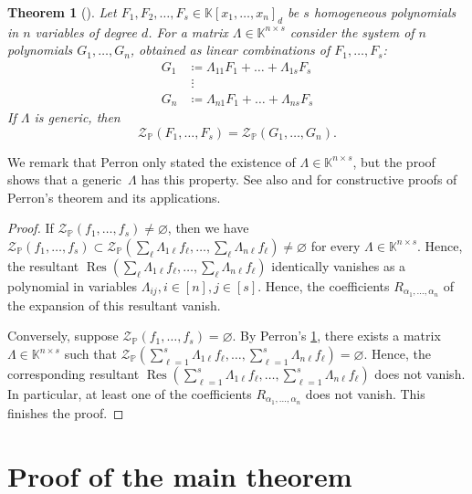 \documentclass[11pt,a4paper]{article}
\newtheorem{theorem}{Theorem}[section]
\numberwithin{equation}{section}
\newcommand{\PP}{\mathbb{P}}
\newcommand{\KK}{\mathbb{K}}
\newcommand{\cZ}{\mathcal{Z}}
\DeclareMathOperator{\Res}{Res}
\begin{document}
\begin{theorem}[{\cite[Satz~3]{Perron-41}}]
\label{thm:perron}
    Let $F_1,F_2,\dots,F_s\in\KK[x_1,\dots,x_n]_d$ be $s$ homogeneous polynomials in $n$ variables of degree $d$. 
    For a matrix $\Lambda\in\KK^{n\times s}$ consider the system of $n$ polynomials $G_1,\dots,G_n$, obtained as linear combinations of $F_1,\dots,F_s$: \[
    \begin{split}
    G_1 &\coloneqq \Lambda_{11} F_1 + \dots + \Lambda_{1s}F_s \\
    &\;\vdots\\
    G_n &\coloneqq \Lambda_{n1}F_1 +\dots+\Lambda_{ns}F_s
    \end{split}
    \] If $\Lambda$ is generic, then \[
    \cZ_{\PP}(F_1,\dots,F_s) = \cZ_{\PP}(G_1,\dots,G_n).
    \]
\end{theorem}
\noindent 
We remark that Perron only stated the existence of $\Lambda\in\KK^{n\times s}$, but the proof shows that a generic~$\Lambda$ has this property.
See also \cite{Chistov-Grigoriev-83} and \cite[Proposition~1]{Koiran-00} for constructive proofs of Perron's theorem and its applications.


\abramov*

\begin{proof}   
If $\cZ_{\PP}(f_1,\dots,f_s)\neq\varnothing$, then we have $\cZ_{\PP}(f_1,\dots,f_s)\subset\cZ_{\PP}(\sum_\ell \Lambda_{1\ell}f_\ell, \dots, \sum_{\ell}\Lambda_{n\ell} f_\ell)\neq \varnothing$ for every $\Lambda\in\KK^{n\times s}$. 
Hence, the resultant $\Res(\sum_\ell \Lambda_{1\ell}f_\ell, \dots, \sum_{\ell}\Lambda_{n\ell} f_\ell)$ identically vanishes as a polynomial in variables $\Lambda_{ij}, i\in [n], j\in [s]$. 
Hence, the coefficients $R_{\alpha_1,\dots,\alpha_n}$ of the expansion of this resultant vanish.

Conversely, suppose $\cZ_{\PP}(f_1,\dots,f_s)=\varnothing$.
    By Perron's \cref{thm:perron}, there exists a matrix $\Lambda\in\KK^{n\times s}$ such that $\cZ_{\PP}(\sum_{\ell=1}^s \Lambda_{1\ell}f_\ell, \dots,\sum_{\ell=1}^s \Lambda_{n\ell} f_\ell)=\varnothing$.
    Hence, the corresponding resultant $\Res(\sum_{\ell=1}^s \Lambda_{1\ell}f_\ell, \dots,\sum_{\ell=1}^s \Lambda_{n\ell} f_\ell)$ does not vanish.
    In particular, at least one of the coefficients $R_{\alpha_1,\dots,\alpha_n}$ does not vanish.
    This finishes the proof.
\end{proof}


\section{Proof of the main theorem}
\label{sec:main}
\end{document}
